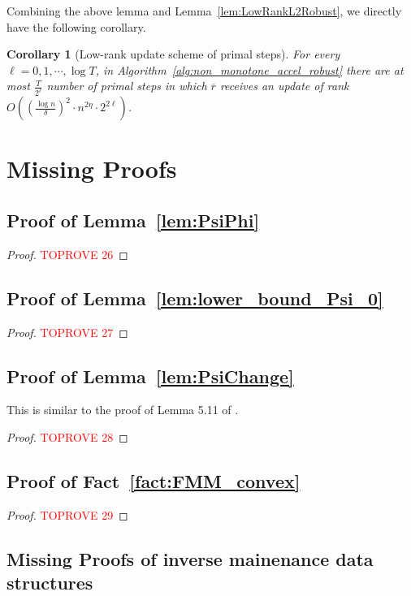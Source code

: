 \documentclass[11pt]{article}
\newtheorem{corollary}[theorem]{Corollary}
\newcommand\rr{\boldsymbol{\mathit{r}}}
\newcommand{\ov}{\overline}
\begin{document}
Combining the above lemma and Lemma~\ref{lem:LowRankL2Robust}, we directly have the following corollary.
\begin{corollary}[Low-rank update scheme of primal steps]
For every $\ell = 0,1, \cdots, \log T$, in Algorithm~\ref{alg:non_monotone_accel_robust} there are at most $\frac{T}{2^{\ell}}$ number of primal steps in which $\ov{\rr}$ receives an update of rank $O((\frac{\log n}{\delta})^2 \cdot n^{2 \eta} \cdot 2^{2\ell})$.
\end{corollary} \section{Missing Proofs}\label{sec:missing_proofs}
\subsection*{Proof of Lemma~\ref{lem:PsiPhi}} 
\begin{proof}\textcolor{red}{TOPROVE 26}\end{proof}

\subsection*{Proof of Lemma~\ref{lem:lower_bound_Psi_0}} 
\begin{proof}\textcolor{red}{TOPROVE 27}\end{proof}


\subsection*{Proof of Lemma~\ref{lem:PsiChange}} 
This is similar to the proof of Lemma 5.11 of \cite{adil2019iterative}.

\begin{proof}\textcolor{red}{TOPROVE 28}\end{proof}

\subsection*{Proof of Fact~\ref{fact:FMM_convex}}

\begin{proof}\textcolor{red}{TOPROVE 29}\end{proof}

\subsection*{Missing Proofs of inverse mainenance data structures}
\end{document}
